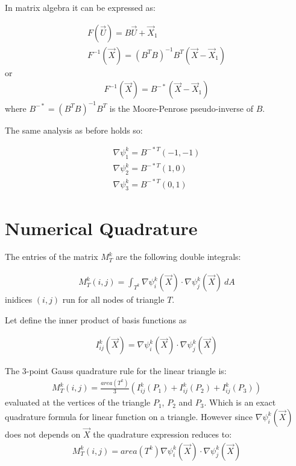 \documentclass{birkjour}
\numberwithin{equation}{section}
\begin{document}
In matrix algebra it can be expressed as:

\begin{eqnarray}
	F(\vec U) = B \vec U + \vec X_1 \nonumber\\
	F^{-1}(\vec X) = (B^T B)^{-1} B^T (\vec X - \vec X_1)  \nonumber
\end{eqnarray}
or
\begin{eqnarray}
	F^{-1}(\vec X) = B^{-*} (\vec X - \vec X_1) \nonumber
\end{eqnarray}
where $B^{-*} = (B^T B)^{-1} B^T$ is the Moore-Penrose pseudo-inverse of $B$.

The same analysis as before holds so:

\begin{eqnarray} 
	\nabla \psi^k_1 = B^{-*T} (-1, -1) \nonumber\\
	\nabla \psi^k_2 = B^{-*T} (1, 0) \nonumber\\
	\nabla \psi^k_3 = B^{-*T} (0, 1) \nonumber
\end{eqnarray}
 
\section{Numerical Quadrature}

The entries of the matrix $M_T^k$ are the following double integrals:

\begin{eqnarray} 
	M_T^k(i,j) = \int_{T^k}{ \nabla \psi^k_i(\vec X) \cdot \nabla \psi^k_j(\vec X) \ dA} \nonumber
\end{eqnarray}
inidices $(i,j)$ run for all nodes of triangle $T$.
 
Let define the inner product of basis functions as  

\begin{eqnarray} 
	I^k_{ij}(\vec X) = \nabla \psi^k_i(\vec X) \cdot \nabla \psi^k_j(\vec X) \nonumber
\end{eqnarray}

The 3-point Gauss quadrature rule for the linear triangle is:
\begin{eqnarray} 
	M_T^k(i,j) = \frac{area(T^k)}{3} ( I^k_{ij}(P_1) +  I^k_{ij}(P_2) +  I^k_{ij}(P_3))
\end{eqnarray}
evaluated at the vertices of the triangle $P_1$, $P_2$ and $P_3$. Which is an exact quadrature formula 
for linear function on a triangle. However since $\nabla \psi^k_i(\vec X)$ does not depends on $\vec X$ the quadrature 
expression reduces to:
\begin{eqnarray} 
	M_T^k(i,j) = area(T^k) \nabla \psi^k_i(\vec X) \cdot \nabla \psi^k_j(\vec X) \nonumber
\end{eqnarray}
\end{document}
